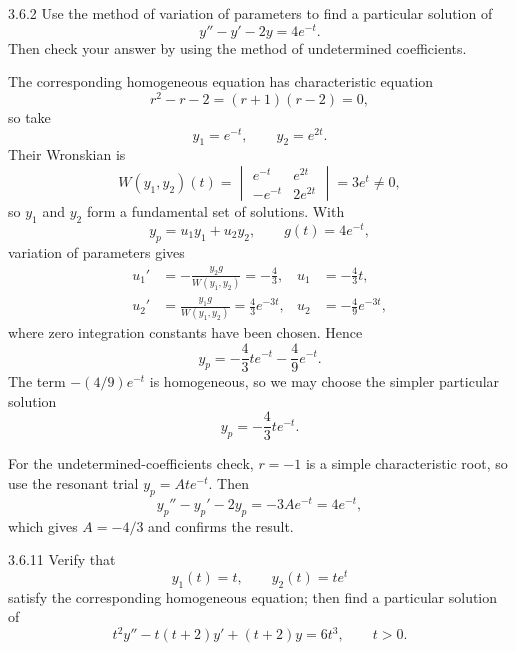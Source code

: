 \documentclass[11pt,oneside]{article}
\begin{document}
\begin{problem}{3.6.2}
Use the method of variation of parameters to find a particular solution of
\[
    y''-y'-2y=4e^{-t}.
\]
Then check your answer by using the method of undetermined coefficients.
\end{problem}

\begin{solution}
The corresponding homogeneous equation has characteristic equation
\[
    r^2-r-2=(r+1)(r-2)=0,
\]
so take
\[
    y_1=e^{-t},
    \qquad
    y_2=e^{2t}.
\]
Their Wronskian is
\[
    W(y_1,y_2)(t)
    =\begin{vmatrix}
        e^{-t} & e^{2t}\\
        -e^{-t} & 2e^{2t}
    \end{vmatrix}
    =3e^t\ne0,
\]
so $y_1$ and $y_2$ form a fundamental set of solutions. With
\[
    y_p=u_1y_1+u_2y_2,
    \qquad
    g(t)=4e^{-t},
\]
variation of parameters gives
\[
\begin{aligned}
    u_1'&=-\frac{y_2g}{W(y_1,y_2)}=-\frac43,
    &u_1&=-\frac43t,\\
    u_2'&=\frac{y_1g}{W(y_1,y_2)}=\frac43e^{-3t},
    &u_2&=-\frac49e^{-3t},
\end{aligned}
\]
where zero integration constants have been chosen. Hence
\[
    y_p=-\frac43te^{-t}-\frac49e^{-t}.
\]
The term $-(4/9)e^{-t}$ is homogeneous, so we may choose the simpler particular solution
\[
    \boxed{y_p=-\frac43te^{-t}}.
\]

For the undetermined-coefficients check, $r=-1$ is a simple characteristic root, so use the resonant trial $y_p=Ate^{-t}$. Then
\[
    y_p''-y_p'-2y_p=-3Ae^{-t}=4e^{-t},
\]
which gives $A=-4/3$ and confirms the result.
\end{solution}

\begin{problem}{3.6.11}
Verify that
\[
    y_1(t)=t,
    \qquad
    y_2(t)=te^t
\]
satisfy the corresponding homogeneous equation; then find a particular solution of
\[
    t^2y''-t(t+2)y'+(t+2)y=6t^3,
    \qquad
    t>0.
\]
\end{problem}
\end{document}
